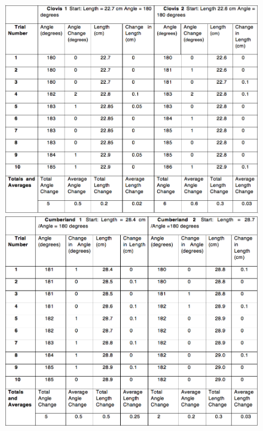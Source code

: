 \begin{figure}[!p]
	\includegraphics[width=\linewidth]{figures/gagglioli_Table1.png}
	\centering
	\label{fig:Table1}
%
	\includegraphics[width=\linewidth]{figures/gagglioli_Table2.png}
	\centering
	\label{fig:Table2}
\end{figure}

